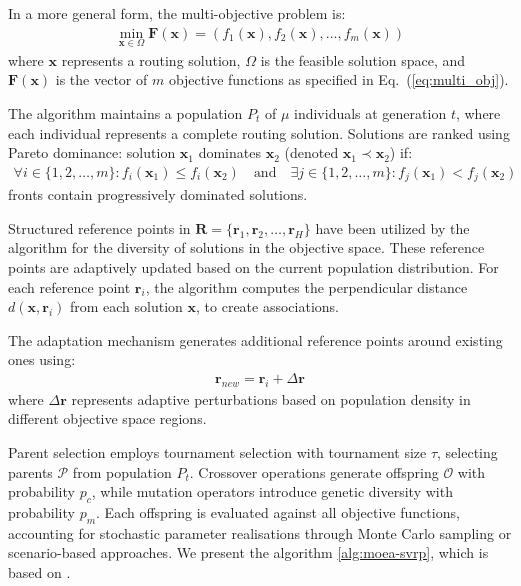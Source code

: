 \documentclass[preprint,12pt]{elsarticle}
\begin{document}
In a more general form, the multi-objective problem is:
  \begin{align}
  \min_{\mathbf{x} \in \Omega} \mathbf{F}(\mathbf{x}) = (f_1(\mathbf{x}), f_2(\mathbf{x}), \ldots, f_m(\mathbf{x}))
  \end{align}
  where $\mathbf{x}$ represents a routing solution, $\Omega$ is the feasible solution space, and $\mathbf{F}(\mathbf{x})$ is the vector of $m$ objective
  functions as specified in Eq.~(\ref{eq:multi_obj}).

  The algorithm maintains a population $P_t$ of $\mu$ individuals at generation $t$, where each individual represents a complete routing solution.
  Solutions are ranked using Pareto dominance: solution $\mathbf{x}_1$ dominates $\mathbf{x}_2$ (denoted $\mathbf{x}_1 \prec \mathbf{x}_2$) if:
  \begin{align}
  \forall i \in \{1,2,\ldots,m\}: f_i(\mathbf{x}_1) \leq f_i(\mathbf{x}_2) \quad \text{and} \quad \exists j \in \{1,2,\ldots,m\}: f_j(\mathbf{x}_1) <
  f_j(\mathbf{x}_2)
  \end{align}
  fronts contain progressively dominated solutions.



  Structured reference points in $\mathbf{R} = \{\mathbf{r}_1, \mathbf{r}_2, \ldots, \mathbf{r}_H\}$ have been utilized by the algorithm for the diversity of solutions in the objective space. These reference points are adaptively updated based on the current population distribution. For each reference point $\mathbf{r}_i$, the algorithm computes the perpendicular distance $d(\mathbf{x}, \mathbf{r}_i)$ from each solution $\mathbf{x}$, to create associations.

  The adaptation mechanism generates additional reference points around existing ones using:
  \begin{align}
  \mathbf{r}_{new} = \mathbf{r}_i + \Delta \mathbf{r}
  \end{align}
  where $\Delta \mathbf{r}$ represents adaptive perturbations based on population density in different objective space regions.

  

  Parent selection employs tournament selection with tournament size $\tau$, selecting parents $\mathcal{P}$ from population $P_t$. Crossover operations
  generate offspring $\mathcal{O}$ with probability $p_c$, while mutation operators introduce genetic diversity with probability $p_m$. Each offspring is
  evaluated against all objective functions, accounting for stochastic parameter realisations through Monte Carlo sampling or scenario-based approaches. We present the algorithm \ref{alg:moea-svrp}, which is based on \cite{nsga3, nsga3part2}.
\end{document}
